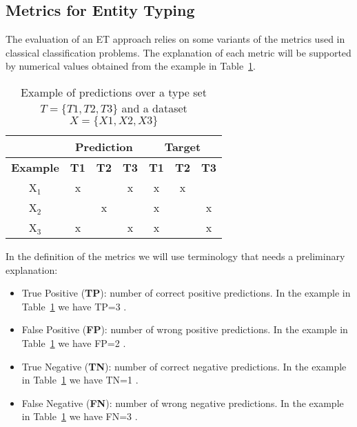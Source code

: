 \subsection{Metrics for Entity Typing}
The evaluation of an ET approach relies on some variants of the metrics used in classical classification problems. The explanation of each metric will be supported by numerical values obtained from the example in Table~\ref{tab:metrics_example}. 

\begin{table}[H]
\centering
\caption{Example of predictions over a type set $T=\{T1, T2, T3\}$ and a dataset $X=\{X1, X2, X3\}$}
\label{tab:metrics_example}
\begin{tabular}{c|ccc|ccc|}
\cline{2-7}
                                       & \multicolumn{3}{c|}{\textbf{Prediction}}                                          & \multicolumn{3}{c|}{\textbf{Target}}                                              \\ \hline
\multicolumn{1}{|c|}{\textbf{Example}} & \multicolumn{1}{c|}{\textbf{T1}} & \multicolumn{1}{c|}{\textbf{T2}} & \textbf{T3} & \multicolumn{1}{c|}{\textbf{T1}} & \multicolumn{1}{c|}{\textbf{T2}} & \textbf{T3} \\ \hline
\multicolumn{1}{|c|}{X$_{1}$}          & x                                &                                  & x           & x                                & x                                &             \\ \hline
\multicolumn{1}{|c|}{X$_{2}$}          &                                  & x                                &             & x                                &                                  & x           \\ \hline
\multicolumn{1}{|c|}{X$_{3}$}          & x                                &                                  & x           & x                                &                                  & x           \\ \hline
\end{tabular}
\end{table}

In the definition of the metrics we will use terminology that needs a preliminary explanation:
\begin{itemize}
    \item True Positive (\textbf{TP}): number of correct positive predictions. In the example in Table~\ref{tab:metrics_example} we have TP=3 .
    \item False Positive (\textbf{FP}): number of wrong positive predictions. In the example in Table~\ref{tab:metrics_example} we have FP=2 .
    \item True Negative (\textbf{TN}): number of correct negative predictions. In the example in Table~\ref{tab:metrics_example} we have TN=1 .
    \item False Negative (\textbf{FN}): number of wrong negative predictions. In the example in Table~\ref{tab:metrics_example} we have FN=3 .
\end{itemize}


